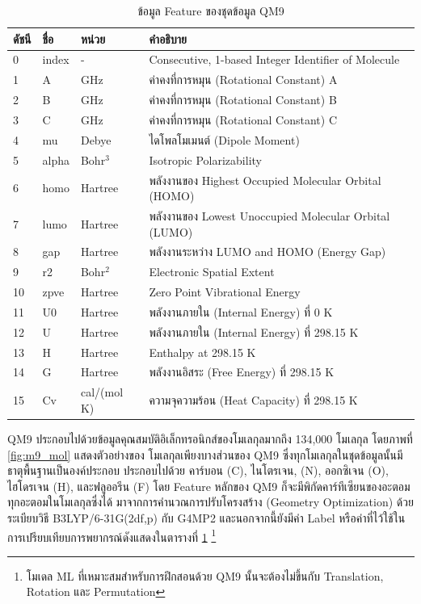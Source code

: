 \begin{table}[H]
    \centering
    \caption{ข้อมูล Feature ของชุดข้อมูล QM9}
    \label{tab:qm9_feature}
    \small
    \begin{tabular}{llll}\toprule
    \textbf{ดัชนี} &\textbf{ชื่อ} &\textbf{หน่วย} &\textbf{คำอธิบาย} \\\midrule
    0 &index &- &Consecutive, 1-based Integer Identifier of Molecule \\
    1 &A &GHz &ค่าคงที่การหมุน (Rotational Constant) A \\
    2 &B &GHz &ค่าคงที่การหมุน (Rotational Constant) B \\
    3 &C &GHz &ค่าคงที่การหมุน (Rotational Constant) C \\
    4 &mu &Debye &ไดโพลโมเมนต์ (Dipole Moment) \\
    5 &alpha &Bohr$^3$ &Isotropic Polarizability \\
    6 &homo &Hartree &พลังงานของ Highest Occupied Molecular Orbital (HOMO) \\
    7 &lumo &Hartree &พลังงานของ Lowest Unoccupied Molecular Orbital (LUMO) \\
    8 &gap &Hartree &พลังงานระหว่าง LUMO and HOMO (Energy Gap) \\
    9 &r2 &Bohr$^2$ &Electronic Spatial Extent \\
    10 &zpve &Hartree &Zero Point Vibrational Energy \\
    11 &U0 &Hartree &พลังงานภายใน (Internal Energy) ที่ 0 K \\
    12 &U &Hartree &พลังงานภายใน (Internal Energy) ที่ 298.15 K \\
    13 &H &Hartree &Enthalpy at 298.15 K \\
    14 &G &Hartree &พลังงานอิสระ (Free Energy) ที่ 298.15 K \\
    15 &Cv &cal/(mol K) &ความจุความร้อน (Heat Capacity) ที่ 298.15 K \\
    \bottomrule
    \end{tabular}
\end{table}

QM9 ประกอบไปด้วยข้อมูลคุณสมบัติอิเล็กทรอนิกส์ของโมเลกุลมากถึง 134,000 โมเลกุล โดยภาพที่ \ref{fig:m9_mol} แสดงตัวอย่างของ%
โมเลกุลเพียงบางส่วนของ QM9 ซึ่งทุกโมเลกุลในชุดข้อมูลนั้นมีธาตุพื้นฐานเป็นองค์ประกอบ ประกอบไปด้วย คาร์บอน (C), ไนโตรเจน, (N), 
ออกซิเจน (O), ไฮโดรเจน (H), และฟลูออรีน (F) โดย Feature หลักของ QM9 ก็จะมีพิกัดคาร์ทีเซียนของอะตอมทุกอะตอมในโมเลกุลซึ่งได้%
มาจากการคำนวณการปรับโครงสร้าง (Geometry Optimization) ด้วยระเบียบวิธี B3LYP/6-31G(2df,p) กับ G4MP2 และนอกจากนี้ยังมีค่า 
Label หรือค่าที่ไว้ใช้ในการเปรียบเทียบการพยากรณ์ดังแสดงในตารางที่ \ref{tab:qm9_feature}%
\footnote{โมเดล ML ที่เหมาะสมสำหรับการฝึกสอนด้วย QM9 นั้นจะต้องไม่ขึ้นกับ Translation, Rotation และ Permutation}

